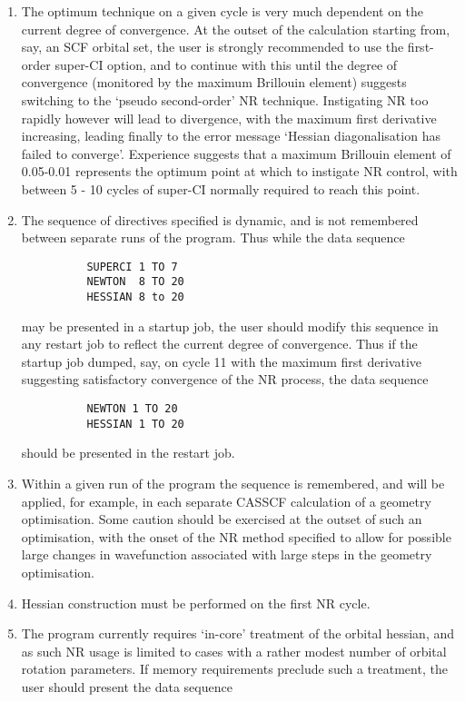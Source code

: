 \documentclass[11pt,fleqn]{article}
\begin{document}
\begin{enumerate}

\item  The optimum technique on a given cycle is very much dependent on the
current degree of convergence. At the outset of the
calculation starting from, say, an SCF orbital set, the user is strongly
recommended to use the first-order super-CI option, and to
continue with this until the degree of convergence (monitored by
the maximum Brillouin element) suggests switching to the
`pseudo second-order' NR technique. Instigating NR too rapidly however
will lead to divergence, with the maximum first derivative increasing,
leading finally to the error message `Hessian diagonalisation
has failed to converge'. Experience suggests that a maximum Brillouin
element of 0.05-0.01 represents the optimum point at which to
instigate NR control, with between 5 - 10 cycles of super-CI
normally required to reach this point.
\item  The sequence of directives specified is dynamic, and is not
remembered between separate runs of the program. Thus while the data
sequence

{
\footnotesize
\begin{verbatim}
          SUPERCI 1 TO 7
          NEWTON  8 TO 20
          HESSIAN 8 to 20
\end{verbatim}
}
may be presented in a startup job, the user should modify this sequence
in any restart job to reflect the current degree of convergence. Thus if
the startup job dumped, say, on cycle 11 with the maximum first
derivative suggesting satisfactory convergence of the NR process, the
data sequence

{
\footnotesize
\begin{verbatim}
          NEWTON 1 TO 20
          HESSIAN 1 TO 20
\end{verbatim}
}
should be presented in the restart job.

\item  Within a given run of the program the sequence is remembered, and
will be applied, for example, in each separate CASSCF calculation of
a geometry optimisation. Some caution should be exercised at the
outset of such an optimisation, with the onset of the NR method specified
to allow for possible large changes in wavefunction associated
with large steps in the geometry optimisation.
\item  Hessian construction must be performed on the first NR cycle.
\item  The program currently requires `in-core' treatment of the orbital
hessian, and as such NR usage is limited to cases with a rather
modest number of orbital rotation parameters. If memory requirements
preclude such a treatment, the user should present the data
sequence


\end{enumerate}
\end{document}
